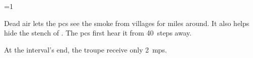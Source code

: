 

\ifnum\value{temperature}=1

  Dead air lets the \glspl{pc} see the smoke from \glspl{village} for miles around.
  It also helps hide the stench of .
  The \glspl{pc} first hear it from 40~\glspl{step} away.

  \basilisk

  At the \gls{interval}'s end, the troupe receive only 2~\glspl{mp}.

\fi


